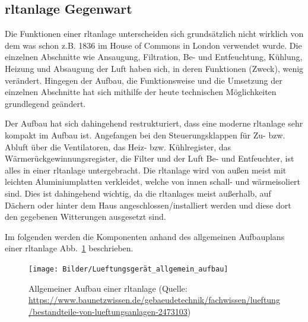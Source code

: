 \subsection{\ac{rltanlage} Gegenwart}
Die Funktionen einer \ac{rltanlage} unterscheiden sich grundsätzlich nicht wirklich von dem was schon z.B. 1836 im House of Commons in London verwendet wurde. Die einzelnen Abschnitte wie \zB Ansaugung, Filtration, Be- und Entfeuchtung, Kühlung, Heizung und Absaugung der Luft haben sich, in deren Funktionen (Zweck), wenig verändert. Hingegen der Aufbau, die Funktionsweise und die Umsetzung der einzelnen Abschnitte hat sich mithilfe der heute technischen Möglichkeiten grundlegend geändert.

Der Aufbau hat sich dahingehend restrukturiert, dass eine moderne \ac{rltanlage} sehr kompakt im Aufbau ist. Angefangen bei den Steuerungsklappen für Zu- bzw. Abluft über die Ventilatoren, das Heiz- bzw. Kühlregister, das Wärmerückgewinnungsregister, die Filter und der Luft Be- und Entfeuchter, ist alles in einer \ac{rltanlage} untergebracht.
Die \ac{rltanlage} wird von außen meist mit leichten Aluminiumplatten verkleidet, welche von innen schall- und wärmeisoliert sind. Dies ist dahingehend wichtig, da die \acp{rltanlage} meist außerhalb, \zB auf Dächern oder hinter dem Haus angeschlossen/installiert werden und diese dort den gegebenen Witterungen ausgesetzt sind. 

Im folgenden werden die Komponenten anhand des allgemeinen Aufbauplans einer \ac{rltanlage} Abb.~\ref{fig:Aufbau_Lueftungsgerät_allgemein} beschrieben. 

\begin{figure}[H]
	\centering
	\texttt{[image: Bilder/Lueftungsgerät\_allgemein\_aufbau]}
	\caption{Allgemeiner Aufbau einer \ac{rltanlage} (Quelle: \url{https://www.baunetzwissen.de/gebaeudetechnik/fachwissen/lueftung/bestandteile-von-lueftungsanlagen-2473103})}
	\label{fig:Aufbau_Lueftungsgerät_allgemein}
\end{figure}


